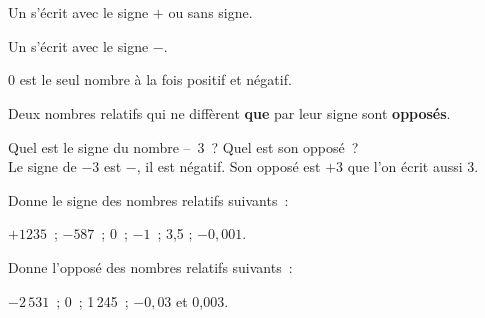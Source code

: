 \section{}


\begin{methode*1}

\begin{aconnaitre}
Un  s'écrit avec le signe $+$ ou sans signe.

Un  s'écrit avec le signe $-$. 

0 est le seul nombre à la fois positif et négatif.

Deux nombres relatifs qui ne diffèrent \textbf{que} par leur signe sont \textbf{opposés}.
\end{aconnaitre}

\begin{exemple*1}
Quel est le signe du nombre – 3 ? Quel est son opposé ? \\[1em]
Le signe de $- 3$ est $-$, il est négatif. Son opposé est $+ 3$ que l'on écrit aussi 3.
\end{exemple*1}

\exercice 
Donne le signe des nombres relatifs suivants :

$+ 1235$ ; $- 587$ ; 0 ; $- 1$ ;  3,5 ; $- 0,001$.

\exercice 
Donne l'opposé des nombres relatifs suivants :

$- 2\,531$ ; 0 ; 1\,245 ;  $- 0,03$ et 0,003.

\end{methode*1}


